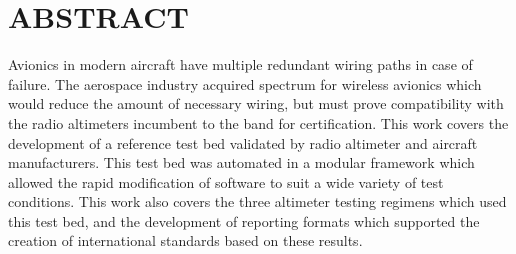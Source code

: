 %
%
%
%

\chapter*{ABSTRACT}

\pagestyle{plain} %
\setcounter{page}{2}

Avionics in modern aircraft have multiple redundant wiring paths in case of failure. The aerospace industry acquired spectrum for wireless avionics which would reduce the amount of necessary wiring, but must prove compatibility with the radio altimeters incumbent to the band for certification. This work covers the development of a reference test bed validated by radio altimeter and aircraft manufacturers. This test bed was automated in a modular framework which allowed the rapid modification of software to suit a wide variety of test conditions. This work also covers the three altimeter testing regimens which used this test bed, and the development of reporting formats which supported the creation of international standards based on these results. 
 

\pagebreak{}
